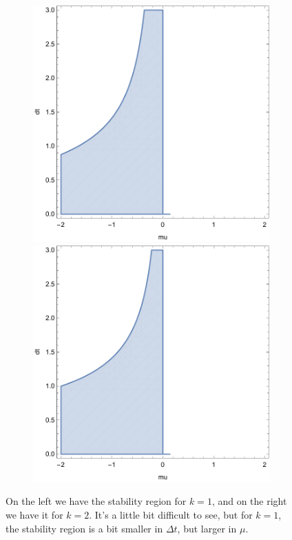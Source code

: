 \begin{figure}[!htb]
  \centering
  \begin{subfigure}{\textwidth}
    \centering
    \includegraphics[width=.49\textwidth]
      {./resources/parareal_stability1}
    \includegraphics[width=.49\textwidth]
      {./resources/parareal_stability2}
  \end{subfigure}%
  \caption{On the left we have the stability region for $k = 1$, and
  on the right we have it for $k = 2$. It's a little bit difficult to see, but
  for $k = 1$, the stability region is a bit smaller in $\Delta t$, but larger
  in $\mu$.}\label{fig:parareal_stability}
\end{figure}
